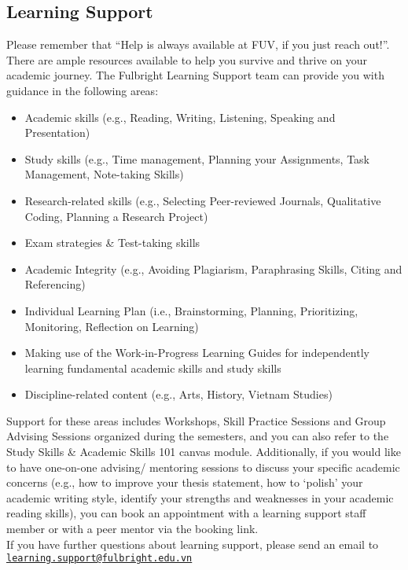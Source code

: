 \documentclass[
]{article}
\providecommand{\tightlist}{%
  \setlength{\itemsep}{0pt}\setlength{\parskip}{0pt}}
\begin{document}
\subsection*{Learning Support}\label{learning-support}

Please remember that ``Help is always available at FUV, if you just reach out!''. There are ample resources available to help you survive and thrive on your academic journey. The Fulbright Learning Support team can provide you with guidance in the following areas:

\begin{itemize}
\tightlist
\item
  Academic skills (e.g., Reading, Writing, Listening, Speaking and Presentation)
\item
  Study skills (e.g., Time management, Planning your Assignments, Task Management, Note-taking Skills)\\
\item
  Research-related skills (e.g., Selecting Peer-reviewed Journals, Qualitative Coding, Planning a Research Project)
\item
  Exam strategies \& Test-taking skills\\
\item
  Academic Integrity (e.g., Avoiding Plagiarism, Paraphrasing Skills, Citing and Referencing)
\item
  Individual Learning Plan (i.e., Brainstorming, Planning, Prioritizing, Monitoring, Reflection on Learning)
\item
  Making use of the Work-in-Progress Learning Guides for independently learning fundamental academic skills and study skills
\item
  Discipline-related content (e.g., Arts, History, Vietnam Studies)
\end{itemize}

Support for these areas includes Workshops, Skill Practice Sessions and Group Advising Sessions organized during the semesters, and you can also refer to the Study Skills \& Academic Skills 101 canvas module. Additionally, if you would like to have one-on-one advising/ mentoring sessions to discuss your specific academic concerns (e.g., how to improve your thesis statement, how to `polish' your academic writing style, identify your strengths and weaknesses in your academic reading skills), you can book an appointment with a learning support staff member or with a peer mentor via the booking link.\\
If you have further questions about learning support, please send an email to \href{mailto:learning.support@fulbright.edu.vn}{\nolinkurl{learning.support@fulbright.edu.vn}}
\end{document}
